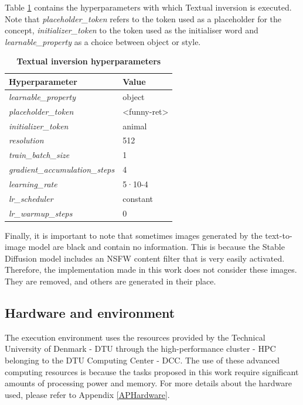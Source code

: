 Table \ref{table:TableTextinversionhyperparameters} contains the hyperparameters with which Textual inversion is executed. Note that \textit{placeholder\_token} refers to the token used as a placeholder for the concept, \textit{initializer\_token} to the token used as the initialiser word and \textit{learnable\_property} as a choice between object or style.

\begin{table}[ht]
\centering
\begin{tabular}{|l|l|}
\hline
\rowcolor[HTML]{AEAAAA} 
\textbf{Hyperparameter} & \textbf{Value} \\ \hline
\textit{learnable\_property} & object \\ \hline
\textit{placeholder\_token} & \textless{}funny-ret\textgreater{} \\ \hline
\textit{initializer\_token} & animal \\ \hline
\textit{resolution} & 512 \\ \hline
\textit{train\_batch\_size} & 1 \\ \hline
\textit{gradient\_accumulation\_steps} & 4 \\ \hline
\textit{learning\_rate} & 5·10-4 \\ \hline
\textit{lr\_scheduler} & constant \\ \hline
\textit{lr\_warmup\_steps} & 0 \\ \hline
\end{tabular}
\caption{\textbf{Textual inversion hyperparameters}}
\label{table:TableTextinversionhyperparameters}
\end{table}

Finally, it is important to note that sometimes images generated by the text-to-image model are black and contain no information. This is because the Stable Diffusion model includes an NSFW content filter that is very easily activated. Therefore, the implementation made in this work does not consider these images. They are removed, and others are generated in their place.

\subsection{Hardware and environment}

The execution environment uses the resources provided by the Technical University of Denmark - DTU through the high-performance cluster - HPC belonging to the DTU Computing Center - DCC. The use of these advanced computing resources is because the tasks proposed in this work require significant amounts of processing power and memory. For more details about the hardware used, please refer to Appendix \ref{APHardware}. 

